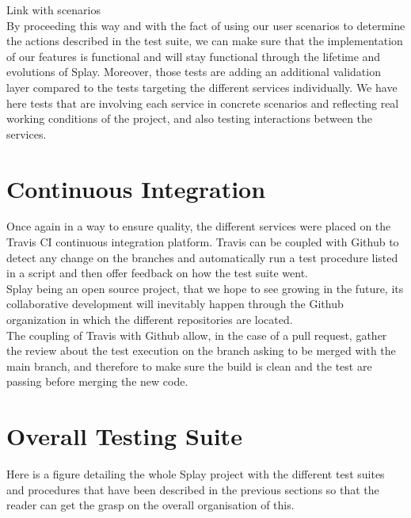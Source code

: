 \documentclass{eplmastersthesis}
\begin{document}
      {\color{red} Link with scenarios}\\

      By proceeding this way and with the fact of using our user scenarios to
      determine the actions described in the test suite, we can make sure
      that the implementation of our features is functional and will stay
      functional through the lifetime and evolutions of Splay. Moreover, those
      tests are adding an additional validation layer compared to the tests
      targeting the different services individually. We have here tests that
      are involving each service in concrete scenarios and reflecting real
      working conditions of the project, and also testing interactions
      between the services.

    \section{Continuous Integration}

      Once again in a way to ensure quality, the different services were placed
      on the Travis CI \cite{travis} continuous integration platform. Travis
      can be coupled with Github to detect any change on the branches and
      automatically run a test procedure listed in a script and then offer
      feedback on how the test suite went.\\

      Splay being an open source project, that we hope to see growing in the
      future, its collaborative development will inevitably happen through
      the Github organization in which the different repositories are located.\\
      The coupling of Travis with Github allow, in the case of a pull request,
      gather the review about the test execution on the branch asking to be
      merged with the main branch, and therefore to make sure the build is
      clean and the test are passing before merging the new code.

    \section{Overall Testing Suite}

      Here is a figure detailing the whole Splay project with the different
      test suites and procedures that have been described in the previous
      sections so that the reader can get the grasp on the overall
      organisation of this.
\end{document}
